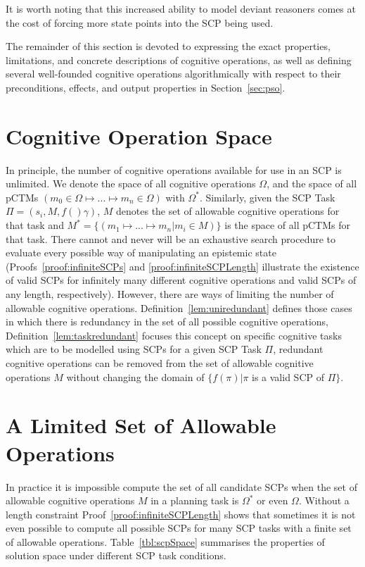 It is worth noting that this increased ability to model deviant reasoners comes at the cost of forcing more state points into the SCP being used.

The remainder of this section is devoted to expressing the exact properties, limitations, and concrete descriptions of cognitive operations, as well as defining several well-founded cognitive operations algorithmically with respect to their preconditions, effects, and output properties in Section~\ref{sec:pso}.

\section{Cognitive Operation Space}
In principle, the number of cognitive operations available for use in an SCP is unlimited. We denote the space of all cognitive operations $\Omega$, and the space of all pCTMs $(m_0 \in \Omega \longmapsto ... \longmapsto m_n \in \Omega)$ with $\Omega^*$. Similarly, given the SCP Task $\Pi=(s_i,M,f() \gamma)$, $M$ denotes the set of allowable cognitive operations for that task and $M^*=\{(m_1 \longmapsto ... \longmapsto m_n| m_i \in M)\}$ is the space of all pCTMs for that task. There cannot and never will be an exhaustive search procedure to evaluate every possible way of manipulating an epistemic state (Proofs~\ref{proof:infiniteSCPs} and \ref{proof:infiniteSCPLength} illustrate the existence of valid SCPs for infinitely many different cognitive operations and valid SCPs of any length, respectively). However, there are ways of limiting the number of allowable cognitive operations. Definition~\ref{lem:uniredundant} defines those cases in which there is redundancy in the set of all possible cognitive operations, Definition~\ref{lem:taskredundant} focuses this concept on specific cognitive tasks which are to be modelled using SCPs for a given SCP Task $\Pi$, redundant cognitive operations can be removed from the set of allowable cognitive operations $M$ without changing the domain of $\{f(\pi)|\pi$ is a valid SCP of $\Pi\}$.


\section{A Limited Set of Allowable Operations}
In practice it is impossible compute the set of all candidate SCPs when the set of allowable cognitive operations $M$ in a planning task is $\Omega^*$ or even $\Omega$. Without a length constraint Proof~\ref{proof:infiniteSCPLength} shows that sometimes it is  not even possible to compute all possible SCPs for many SCP tasks with a finite set of allowable operations. Table~\ref{tbl:scpSpace} summarises the properties of solution space under different SCP task conditions.

